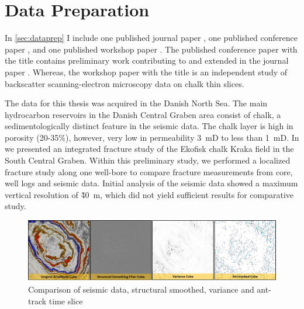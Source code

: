 \section{Data Preparation}

In \cref{sec:dataprep} I include one published journal paper \citep{aabo2018integrated}, one published conference paper \citep{aabo2017correlation}, and one published workshop paper \citep{dramsch2018gaussian}. The published conference paper with the title  contains preliminary work contributing to and extended in the journal paper . Whereas, the workshop paper with the title  is an independent study of backscatter scanning-electron microscopy data on chalk thin slices.

The data for this thesis was acquired in the Danish North Sea. The main hydrocarbon reservoirs in the Danish Central Graben area consist of chalk, a sedimentologically distinct feature in the seismic data. The chalk layer is high in porosity (20-35\%), however, very low in permeability 3~mD to less than 1~mD. In \citet{aabo2017correlation} we presented an integrated fracture study of the Ekofisk chalk Kraka field in the South Central Graben. Within this preliminary study, we performed a localized fracture study along one well-bore to compare fracture measurements from core, well logs and seismic data. Initial analysis of the seismic data showed a maximum vertical resolution of \~40~m, which did not yield sufficient results for comparative study. 

\begin{figure}[!ht]
    \centering
    \includegraphics[width=\textwidth]{figures/seismic-comparisons.png}
    \caption{Comparison of seismic data, structural smoothed, variance and ant-track time slice}
    \label{fig:seismic-comparison}
\end{figure}

